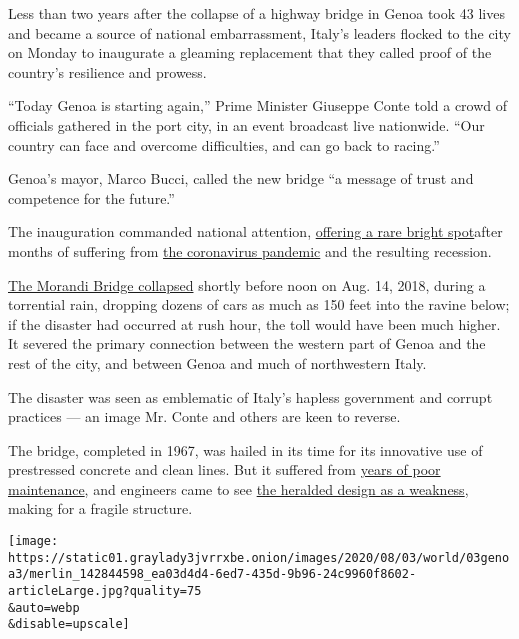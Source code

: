Less than two years after the collapse of a highway bridge in Genoa took
43 lives and became a source of national embarrassment, Italy's leaders
flocked to the city on Monday to inaugurate a gleaming replacement that
they called proof of the country's resilience and prowess.

``Today Genoa is starting again,'' Prime Minister Giuseppe Conte told a
crowd of officials gathered in the port city, in an event broadcast live
nationwide. ``Our country can face and overcome difficulties, and can go
back to racing.''

Genoa's mayor, Marco Bucci, called the new bridge ``a message of trust
and competence for the future.''

The inauguration commanded national attention,
\href{https://www.nytimes3xbfgragh.onion/2020/08/02/world/europe/genoa-Morandi-bridge-replacement.html}{offering
a rare bright spot}after months of suffering from
\href{https://www.nytimes3xbfgragh.onion/2020/07/31/world/europe/italy-coronavirus-reopening.html}{the
coronavirus pandemic} and the resulting recession.

\href{https://www.nytimes3xbfgragh.onion/interactive/2018/09/06/world/europe/genoa-italy-bridge.html}{The
Morandi Bridge collapsed} shortly before noon on Aug. 14, 2018, during a
torrential rain, dropping dozens of cars as much as 150 feet into the
ravine below; if the disaster had occurred at rush hour, the toll would
have been much higher. It severed the primary connection between the
western part of Genoa and the rest of the city, and between Genoa and
much of northwestern Italy.

The disaster was seen as emblematic of Italy's hapless government and
corrupt practices --- an image Mr. Conte and others are keen to reverse.

The bridge, completed in 1967, was hailed in its time for its innovative
use of prestressed concrete and clean lines. But it suffered from
\href{https://www.nytimes3xbfgragh.onion/2018/08/15/world/europe/italy-genoa-bridge-collapse.html}{years
of poor maintenance}, and engineers came to see
\href{https://www.nytimes3xbfgragh.onion/2018/08/16/world/europe/italy-bridge-collapse-design.html}{the
heralded design as a weakness}, making for a fragile structure.

\texttt{[image: https://static01.graylady3jvrrxbe.onion/images/2020/08/03/world/03genoa3/merlin\_142844598\_ea03d4d4-6ed7-435d-9b96-24c9960f8602-articleLarge.jpg?quality=75\\\&auto=webp\\\&disable=upscale]}

